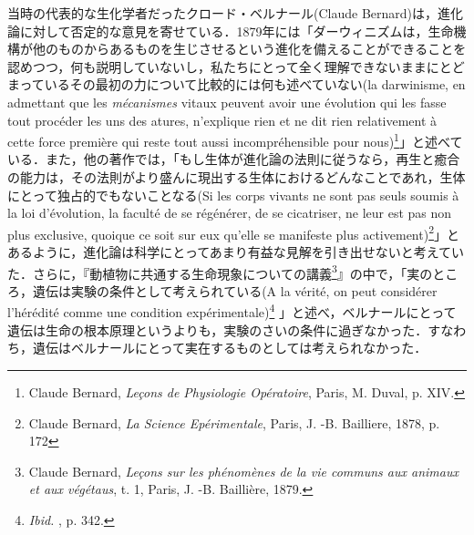 当時の代表的な生化学者だったクロード・ベルナール(Claude Bernard)は，進化論に対して否定的な意見を寄せている．1879年には「ダーウィニズムは，生命機構が他のものからあるものを生じさせるという進化を備えることができることを認めつつ，何も説明していないし，私たちにとって全く理解できないままにとどまっているその最初の力について比較的には何も述べていない(la darwinisme, en admettant que les \emph{mécanismes} vitaux peuvent avoir une évolution qui les fasse tout procéder les uns des atures, n'explique rien et ne dit rien relativement à cette force première qui reste tout aussi incompréhensible pour nous)\footnote{Claude Bernard, \emph{Leçons de Physiologie Opératoire}, Paris, M. Duval, p. XIV.}」と述べている．また，他の著作では，「もし生体が進化論の法則に従うなら，再生と癒合の能力は，その法則がより盛んに現出する生体におけるどんなことであれ，生体にとって独占的でもないことなる(Si les corps vivants ne sont pas seuls soumis à la loi d’évolution, la faculté de se régénérer, de se cicatriser, ne leur est pas non plus exclusive, quoique ce soit sur eux qu’elle se manifeste plus activement)\footnote{Claude Bernard, \emph{La Science Epérimentale}, Paris, J. -B. Bailliere, 1878, p. 172}」とあるように，進化論は科学にとってあまり有益な見解を引き出せないと考えていた．さらに，『動植物に共通する生命現象についての講義\footnote{Claude Bernard, \emph{Leçons sur les phénomènes de la vie communs aux animaux et aux végétaus}, t. 1, Paris, J. -B. Baillière, 1879.}』の中で，「実のところ，遺伝は実験の条件として考えられている(A la vérité, on peut considérer l'hérédité comme une condition expérimentale)\footnote{\emph{Ibid. }, p. 342.} 」と述べ，ベルナールにとって遺伝は生命の根本原理というよりも，実験のさいの条件に過ぎなかった．すなわち，遺伝はベルナールにとって実在するものとしては考えられなかった．

